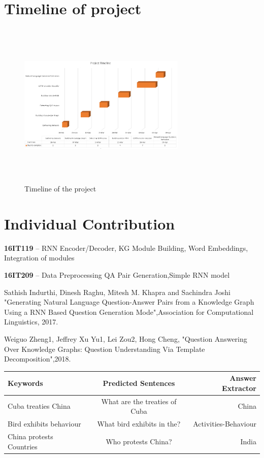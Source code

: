 \documentclass[conference]{IEEEtran}
\begin{document}
\section{Timeline of project}
\begin{figure}[htpb]
\centerline{\includegraphics[height=8cm,width=8cm]{GanttChart.PNG}}
\caption{Timeline of the project}
\label{fig}
\end{figure}

\section{Individual Contribution}
\textbf{16IT119} – RNN Encoder/Decoder, KG Module Building, Word
Embeddings, Integration of modules

\textbf{16IT209} – Data Preprocessing QA Pair Generation,Simple RNN
model

\begin{thebibliography}{00}
 Sathish Indurthi, Dinesh Raghu, Mitesh M. Khapra and Sachindra Joshi "Generating Natural Language Question-Answer Pairs from a Knowledge Graph Using a RNN Based Question Generation Mode",Association for Computational Linguistics, 2017.

 Weiguo Zheng1, Jeffrey Xu Yu1, Lei Zou2, Hong Cheng, "Question Answering Over Knowledge Graphs: Question Understanding Via Template Decomposition",2018.
\end{thebibliography}
\begin{table}[]

\begin{tabular}{|l|c|r|}
	\hline
	Keywords & Predicted Sentences & Answer Extractor\\
	\hline
    Cuba treaties China & What are the treaties of Cuba & China\\
	\hline
    Bird exhibits behaviour & What bird exhibits in the? & Activities-Behaviour\\
    \hline
    China protests Countries & Who protests China? & India\\
    
	\hline
\end{tabular}
\end{table}
\end{document}
